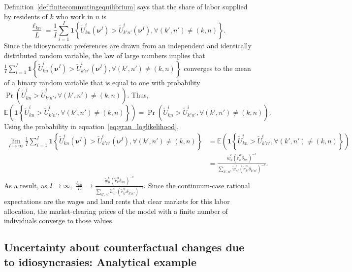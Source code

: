 \documentclass[11pt]{article}
\theoremstyle{definition}
\newcommand\idiosyncraticphrase{idiosyncratic preference}
\begin{document}
Definition~\ref{def:finitecommutingequilibrium} says that the share of labor supplied by residents of $k$ who work in $n$ is
\begin{equation*}
\frac{\ell_{kn}}{L} = \frac{1}{I} \sum_{i=1}^I \textbf{1}\left\lbrace \tilde{U}^i_{kn}(\boldsymbol{\nu}^I) >  \tilde{U}^i_{k'n'}(\boldsymbol{\nu}^I), \forall (k',n')  \neq (k,n)  \right\rbrace.
\end{equation*}
Since the \idiosyncraticphrase s are drawn from an independent and identically distributed random variable, the law of large numbers implies that
$\frac{1}{I} \sum_{i=1}^I \textbf{1}\left\lbrace \tilde{U}^i_{kn}(\boldsymbol{\nu}^I) >  \tilde{U}^i_{k'n'}(\boldsymbol{\nu}^I), \forall (k',n')  \neq (k,n)  \right\rbrace$ converges to the mean of a binary random variable that is equal to one with probability  
$\Pr(\tilde{U}^i_{kn} >  \tilde{U}^i_{k'n'}, \forall (k',n')  \neq (k,n))$. Thus, 
$$\mathbb{E}\left(\textbf{1}\left\lbrace \tilde{U}^i_{kn} >  \tilde{U}^i_{k'n'}, \forall (k',n')  \neq (k,n)  \right\rbrace\right)
=
\Pr\left(\tilde{U}^i_{kn} >  \tilde{U}^i_{k'n'}, \forall (k',n')  \neq (k,n)\right).
$$ 
Using the probability in equation~\eqref{eq:gran_loglikelihood},
\begin{align*}
\lim_{I\to\infty}
\frac{1}{I} \sum_{i=1}^I \textbf{1}\left\lbrace \tilde{U}^i_{kn}(\boldsymbol{\nu}^I) >  \tilde{U}^i_{k'n'}(\boldsymbol{\nu}^I), \forall (k',n')  \neq (k,n)  \right\rbrace 
&=
\mathbb{E}\left(\textbf{1}\left\lbrace \tilde{U}^i_{kn} >  \tilde{U}^i_{k'n'}, \forall (k',n')  \neq (k,n)  \right\rbrace\right)
\\ 
&=
\frac{\tilde{w}^\epsilon_n (\tilde{r}^\alpha_k \delta_{kn})^{-\epsilon} }{\sum_{k',n'}\tilde{w}^\epsilon_{n'} (\tilde{r}^\alpha_{k'} \delta_{k'n'})^{-\epsilon}}
.\end{align*}
As a result, as $I \rightarrow \infty$,
$
\frac{\ell_{kn}}{L} \rightarrow \frac{\tilde{w}^\epsilon_n (\tilde{r}^\alpha_k \delta_{kn})^{-\epsilon} }{\sum_{k',n'}\tilde{w}^\epsilon_{n'} (\tilde{r}^\alpha_{k'} \delta_{k'n'})^{-\epsilon}}.
$
Since the continuum-case rational expectations are the wages and land rents that clear markets for this labor allocation,
the market-clearing prices of the model with a finite number of individuals converge to those values.

\subsection{Uncertainty about counterfactual changes due to idiosyncrasies: Analytical example \label{sec:appendix:theory:uncertainty}}
\end{document}
